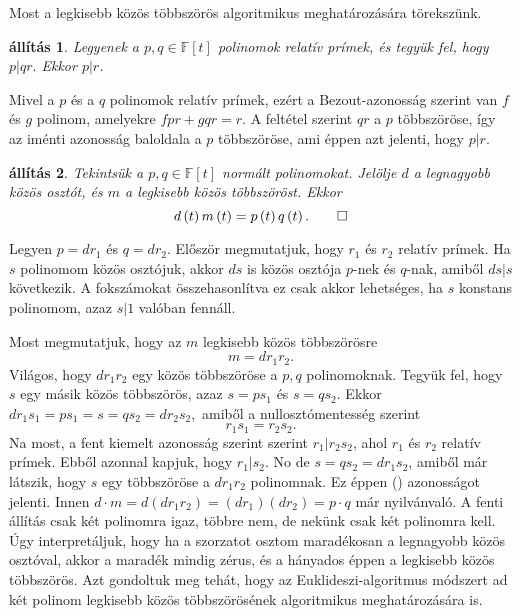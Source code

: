 \documentclass[9pt, a4paper, showtrims]{memoir}
\makeatletter
\renewenvironment{proof}[1][\proofname]
    {\par\pushQED{\qed}%
    \normalfont \topsep6\p@\@plus6\p@\relax
    \trivlist
    \item[\hskip\labelsep
        \itshape
    #1\@addpunct{:}]\ignorespaces}
    {\popQED\endtrivlist\@endpefalse}
\theoremstyle{plain}
\newtheorem{proposition}{állítás}[chapter]
\theoremstyle{remark}
\theoremstyle{definition}
\makeatother
\begin{document}
Most a legkisebb közös többszörös algoritmikus meghatározására törekszünk.
\begin{proposition}\label{pr:rprim}
    Legyenek a $p,q\in\mathbb{F}\left[ t \right]$ polinomok relatív prímek,
    és tegyük fel, hogy 
    \begin{math}
        p|qr.
    \end{math}
    Ekkor $p|r$.
\end{proposition}
\begin{proof}
    Mivel a $p$ és a $q$ polinomok relatív prímek,
    ezért a Bezout-azonosság szerint van $f$ és $g$ polinom, amelyekre
    \(
    fpr+gqr=r.
    \)
    A feltétel szerint $qr$ a $p$ többszöröse, 
    így az iménti azonosság baloldala a $p$ többszöröse,
    ami éppen azt jelenti, hogy $p|r$.
\end{proof}
\begin{proposition}
    Tekintsük a $p,q\in\mathbb{F}\left[ t \right]$ normált polinomokat.
    Jelölje $d$ a legnagyobb közös osztót, 
    és
    $m$ a legkisebb közös többszöröst.
    Ekkor
    \begin{displaymath}
        d\left( t \right)m\left( t \right)=p\left( t \right)q\left( t \right).\qedhere
    \end{displaymath}
\end{proposition}
\begin{proof}
    Legyen $p=dr_1$ és $q=dr_2$.
    Először megmutatjuk, hogy $r_1$ és $r_2$ relatív prímek.
    Ha $s$ polinomom közös osztójuk, akkor $ds$ is közös osztója $p$-nek és $q$-nak,
    amiből $ds|s$ következik.
    A fokszámokat összehasonlítva ez csak akkor lehetséges, ha $s$ konstans polinomom, 
    azaz $s|1$ valóban fennáll.

    Most megmutatjuk, hogy az $m$ legkisebb közös többszörösre
    \[
        m=dr_1r_2.\tag{\dag}
    \]
    Világos, hogy $dr_1r_2$ egy közös többszöröse a $p,q$ polinomoknak.
    Tegyük fel, hogy $s$ egy másik közös többszörös, azaz 
    $s=ps_1$ és $s=qs_2$.
    Ekkor 
    \begin{math}
        dr_1s_1=ps_1=s=qs_2=dr_2s_2,
    \end{math}
    amiből a nullosztómentesség szerint 
    \[
        r_1s_1=r_2s_2.
    \]
    Na most,
    a fent kiemelt azonosság szerint szerint $r_1|r_2s_2$, ahol $r_1$ és $r_2$ relatív prímek.
    Ebből azonnal kapjuk, hogy $r_1|s_2$.
    No de $s=qs_2=dr_1s_2$, amiből már látszik, 
    hogy $s$ egy többszöröse a $dr_1r_2$ polinomnak.
    Ez éppen (\dag) azonosságot jelenti.
    Innen
    $d\cdot m=d(dr_1r_2)=(dr_1)(dr_2)=p\cdot q$ már nyilvánvaló.
\end{proof}
A fenti állítás csak két polinomra igaz, többre nem,
de nekünk csak két polinomra kell.
Úgy interpretáljuk, 
hogy ha a szorzatot osztom maradékosan a legnagyobb közös osztóval, akkor a maradék mindig 
zérus, 
és a hányados éppen a legkisebb közös többszörös.
Azt gondoltuk meg tehát, 
hogy az Euklideszi-algoritmus módszert ad két polinom legkisebb közös többszörösének algoritmikus meghatározására is.
\end{document}
